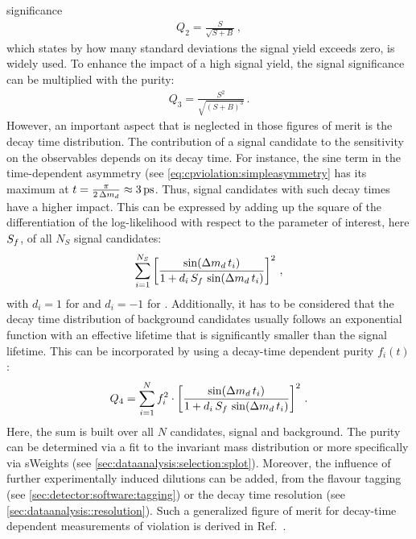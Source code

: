 significance
\begin{align}
	Q_2 = \frac{S}{\sqrt{S + B}}\,,
\end{align}
which states by how many standard deviations the signal yield exceeds zero, is
widely used. To enhance the impact of a high signal yield, the signal
significance can be multiplied with the purity:
\begin{align}
	Q_3 = \frac{S^2}{\sqrt{(S + B)^3}}\,.
\end{align}
However, an important aspect that is neglected in those figures of merit is
the decay time distribution. The contribution of a signal candidate to the
sensitivity on the \CP observables depends on its decay time. For instance,
the sine term in the time-dependent asymmetry (see
\cref{eq:cpviolation:simpleasymmetry} has its maximum at $t =
\frac{\pi}{2\,\dmd} \approx \SI{3}{\ps}$. Thus, signal candidates with such
decay times have a higher impact. This can be expressed by adding up the
square of the differentiation of the log-likelihood with respect to the
parameter of interest, here $S_{f}$, of all $N_S$ signal candidates:
\begin{align}
	\sum_{i=1}^{N_S} \left[\frac{\sin({\Delta m_{{d}}}\,t_i)}{1 + d_i\,S_f\,\sin({\Delta m_{{d}}}\,t_i)}\right]^2\,,
\end{align}
with $d_i = \num{+1}$ for \Bd and $d_i = \num{-1}$ for \Bdb. Additionally, it
has to be considered that the decay time distribution of background candidates
usually follows an exponential function with an effective lifetime that is
significantly smaller than the \Bd signal lifetime. This can be incorporated
by using a decay-time dependent purity $f_i(t)$:
\begin{align}
	Q_4 = \sum_{i=1}^{N} f_i^2 \cdot \left[\frac{\sin({\Delta m_{{d}}}\,t_i)}{1 + d_i\,S_f\,\sin({\Delta m_{{d}}}\,t_i)}\right]^2\,.
\end{align}
Here, the sum is built over all $N$ candidates, signal and background. The
purity can be determined via a fit to the invariant mass distribution or more
specifically via sWeights (see \cref{sec:dataanalysis:selection:splot}).
Moreover, the influence of further experimentally induced dilutions can be
added, \eg from the flavour tagging (see \cref{sec:detector:software:tagging})
or the decay time resolution (see \cref{sec:dataanalysis::resolution}). Such a
generalized figure of merit for decay-time dependent measurements of
\CP violation is derived in Ref.~\cite{FOM}.